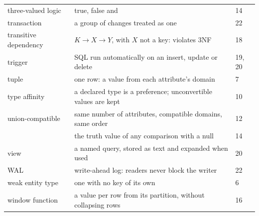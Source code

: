 \begin{longtable}{@{}L{3.9cm}L{8.9cm}R{1.2cm}@{}}
three-valued logic & true, false and \unk{} & 14 \\
transaction & a group of changes treated as one & 22 \\
transitive dependency & $K \rightarrow X \rightarrow Y$, with $X$ not a key:
  violates 3NF & 18 \\
trigger & SQL run automatically on an insert, update or delete & 19, 20 \\
tuple & one row: a value from each attribute's domain & 7 \\
type affinity & a declared type is a preference; unconvertible values are kept
  & 10 \\
union-compatible & same number of attributes, compatible domains, same order &
  12 \\
\unk{} & the truth value of any comparison with a null & 14 \\
view & a named query, stored as text and expanded when used & 20 \\
WAL & write-ahead log: readers never block the writer & 22 \\
weak entity type & one with no key of its own & 6 \\
window function & a value per row from its partition, without collapsing rows
  & 16 \\
\bottomrule
\end{longtable}
